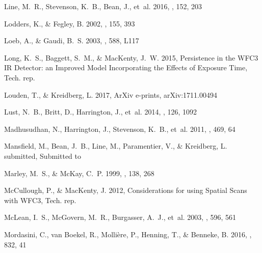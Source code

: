 \documentclass[twocolumn, trackchanges]{aastex61}
\begin{document}
\begin{thebibliography}{}
{Line}, M.~R., {Stevenson}, K.~B., {Bean}, J., {et~al.} 2016, \aj, 152, 203

{Lodders}, K., \& {Fegley}, B. 2002, \icarus, 155, 393

{Loeb}, A., \& {Gaudi}, B.~S. 2003, \apjl, 588, L117

{Long}, K.~S., {Baggett}, S.~M., \& {MacKenty}, J.~W. 2015, {Persistence in the
  WFC3 IR Detector: an Improved Model Incorporating the Effects of Exposure
  Time}, Tech. rep.

{Louden}, T., \& {Kreidberg}, L. 2017, ArXiv e-prints, arXiv:1711.00494

{Lust}, N.~B., {Britt}, D., {Harrington}, J., {et~al.} 2014, \pasp, 126, 1092

{Madhusudhan}, N., {Harrington}, J., {Stevenson}, K.~B., {et~al.} 2011, \nat,
  469, 64

{Mansfield}, M., {Bean}, J.~B., {Line}, M., {Paramentier}, V., \& {Kreidberg},
  L. submitted, Submitted to \apj

{Marley}, M.~S., \& {McKay}, C.~P. 1999, \icarus, 138, 268

{McCullough}, P., \& {MacKenty}, J. 2012, {Considerations for using Spatial
  Scans with WFC3}, Tech. rep.

{McLean}, I.~S., {McGovern}, M.~R., {Burgasser}, A.~J., {et~al.} 2003, \apj,
  596, 561

{Mordasini}, C., {van Boekel}, R., {Molli{\`e}re}, P., {Henning}, T., \&
  {Benneke}, B. 2016, \apj, 832, 41


\end{thebibliography}
\end{document}
